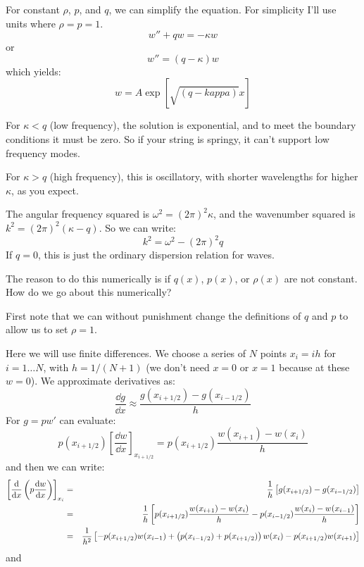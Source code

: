 For constant $\rho$, $p$, and $q$, we can simplify the equation. For
simplicity I'll use units where $\rho = p =1$.
\begin{equation}
w'' + q w = - \kappa w
\end{equation}
or 
\begin{equation}
w'' = (q - \kappa) w
\end{equation}
which yields:
\begin{equation}
w = A \exp\left[\sqrt{(q- kappa)} x\right]
\end{equation}


\begin{answer}
For $\kappa < q$ (low frequency), the solution is exponential, and to
meet the boundary conditions it must be zero. So if your string is
springy, it can't support low frequency modes.

For $\kappa > q$ (high frequency), this is oscillatory, with shorter
wavelengths for higher $\kappa$, as you expect.
\end{answer}


\begin{answer}
The angular frequency squared is $\omega^2 = (2\pi)^2 \kappa$, and the
wavenumber squared is $k^2 = (2\pi)^2 (\kappa - q)$. So we can write:
\begin{equation}
k^2 = \omega^2 - (2\pi)^2 q
\end{equation}
If $q=0$, this is just the ordinary dispersion relation for waves.
\end{answer}

The reason to do this numerically is if $q(x)$, $p(x)$, or $\rho(x)$
are not constant. How do we go about this numerically?

First note that we can without punishment change the definitions of
$q$ and $p$ to allow us to set $\rho=1$. 

Here we will use finite differences. We choose a series of $N$ points
$x_i = i h $ for $i=1\ldots N$, with $h=1/(N+1)$ (we don't need $x=0$
or $x=1$ because at these $w=0$). We approximate derivatives as:
\begin{equation}
\frac{\dd{g}}{\dd{x}} \approx \frac{g(x_{i+1/2}) - g(x_{i-1/2})}{h}
\end{equation}
For $g=p w'$ can evaluate:
\begin{equation}
p(x_{i+1/2})\left[\frac{\dd{w}}{\dd{x}}\right]_{x_{i+1/2}} =
p(x_{i+1/2}) \frac{w(x_{i+1}) - w(x_i)}{h}
\end{equation}
and then we can write:
\begin{eqnarray}
  \left[\frac{{\rm d}}{{\rm d}x}\left(p\frac{{\rm d}w}{{\rm d}x}\right)\right]_{x_i}
  &=& \frac{1}{h}\left[g(x_{i+1/2}) - g(x_{i-1/2})\right] \cr
  &=& \frac{1}{h}\left[p(x_{i+1/2}) \frac{w(x_{i+1}) - w(x_i)}{h}
    - p(x_{i-1/2}) \frac{w(x_{i}) - w(x_{i-1})}{h}\right] \cr
  &=& \frac{1}{h^2}\left[ - p(x_{i+1/2}) w(x_{i-1})
    + \left(p(x_{i-1/2}) + p(x_{i+1/2})\right) w(x_i)
    - p(x_{i+1/2}) w(x_{i+1})\right]
\end{eqnarray}
and 

